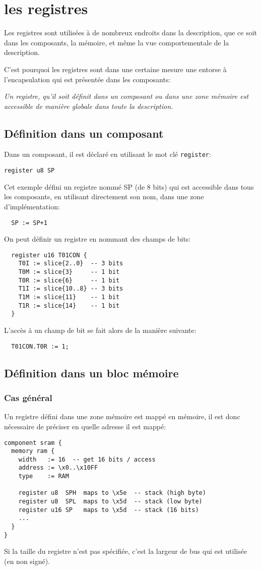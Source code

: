 \section{les registres}
\label{sec:defReg}
Les registres sont utilisées à de nombreux endroits dans la description, que ce soit dans les composants, la mémoire, et même la vue comportementale de la description.

C'est pourquoi les registres sont dans une certaine mesure une entorse à l'encapsulation qui est présentée dans les composants: 

\emph{Un registre, qu'il soit définit dans un composant ou dans une zone mémoire est accessible de manière globale dans toute la description.}

\subsection{Définition dans un composant}
Dans un composant, il est déclaré en utilisant le mot clé \texttt{register}:
\begin{lstlisting}
register u8 SP
\end{lstlisting}
Cet exemple défini un registre nommé SP (de 8 bits) qui est accessible dans tous les composants, en utilisant directement son nom, dans une zone d'implémentation:
\begin{lstlisting}
  SP := SP+1
\end{lstlisting}
On peut définir un registre en nommant des champs de bits:
\begin{lstlisting}
  register u16 T01CON {
    T0I := slice{2..0}  -- 3 bits
    T0M := slice{3}     -- 1 bit
    T0R := slice{6}     -- 1 bit
    T1I := slice{10..8} -- 3 bits
    T1M := slice{11}    -- 1 bit
    T1R := slice{14}    -- 1 bit
  }
\end{lstlisting}
L'accès à un champ de bit se fait alors de la manière suivante:
\begin{lstlisting}
  T01CON.T0R := 1;
\end{lstlisting}

\subsection{Définition dans un bloc mémoire}
\subsubsection{Cas général}
Un registre défini dans une zone mémoire est mappé en mémoire, il est donc nécessaire de préciser en quelle adresse il est mappé:
\begin{lstlisting}
component sram {
  memory ram {
    width   := 16  -- get 16 bits / access
    address := \x0..\x10FF 
    type    := RAM 

    register u8  SPH  maps to \x5e  -- stack (high byte)
    register u8  SPL  maps to \x5d  -- stack (low byte)
    register u16 SP   maps to \x5d  -- stack (16 bits)
    ...
  }
}
\end{lstlisting}
Si la taille du registre n'est pas spécifiée, c'est la largeur de bus qui est utilisée (en non signé).

